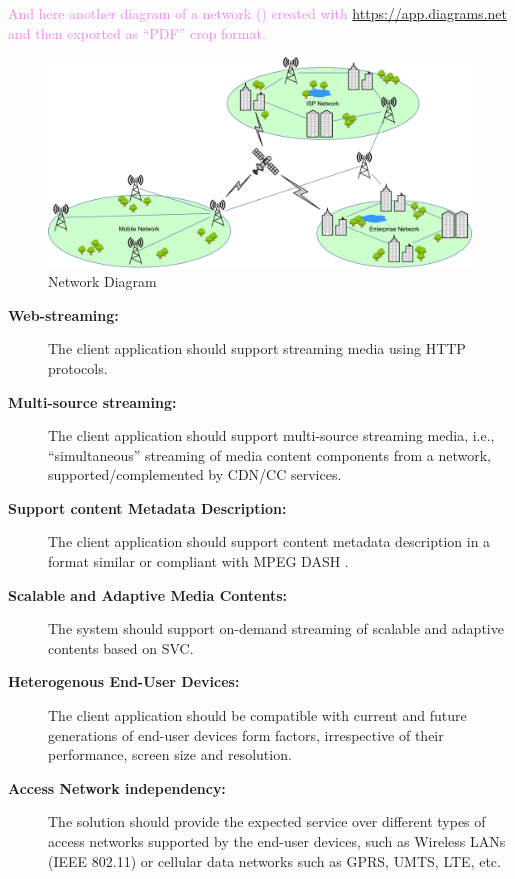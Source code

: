\textcolor{violet}{And here another diagram of a network () created with \url{https://app.diagrams.net} and then exported as ``PDF'' crop format.}

\begin{figure}[ht]
\centering
\includegraphics[width=1.0\textwidth]{./Images/Network_from_draw-io.pdf}
\caption{Network Diagram}
\label{fig:network}
\end{figure}

\begin{description}
	\item[\textbf{Web-streaming:}]
	The client application should support streaming media using \ac{HTTP} protocols.
	\item[\textbf{Multi-source streaming:}]
	The client application should support multi-source streaming media, i.e., ``simultaneous'' streaming of media content components from a network, supported\slash complemented by \ac{CDN}\slash \ac{CC} services. 
	\item[\textbf{Support content Metadata Description:}]
	The client application should support content metadata description in a format similar or compliant with MPEG \ac{DASH} \cite{ISO/IEC:2012fk}. 
	\item[\textbf{Scalable and Adaptive Media Contents:}]
	The system should support on-demand streaming of scalable and adaptive contents based on \ac{SVC}.
	\item[\textbf{Heterogenous End-User Devices:}]
	The client application should be compatible with current and future generations of end-user devices form factors, irrespective of their performance, screen size and resolution.
	\item[\textbf{Access Network independency:}] 
	The solution should provide the expected service over different types of access networks supported by the end-user devices, such as Wireless \acp{LAN} (IEEE 802.11) or cellular data networks such as \ac{GPRS}, \ac{UMTS}, \ac{LTE}, etc.
\end{description}

